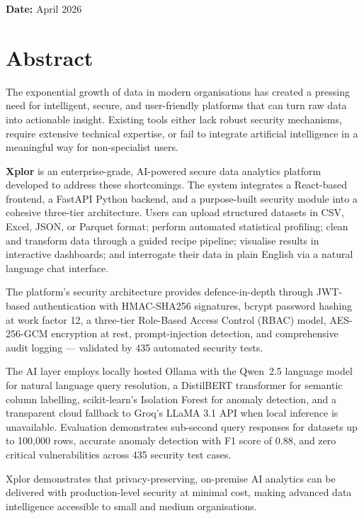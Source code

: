 \documentclass[12pt,a4paper]{report}
\begin{document}
\vspace{1.5cm}
\noindent\textbf{Date:} April 2026

\chapter*{Abstract}

The exponential growth of data in modern organisations has created a pressing need for intelligent, secure, and user-friendly platforms that can turn raw data into actionable insight. Existing tools either lack robust security mechanisms, require extensive technical expertise, or fail to integrate artificial intelligence in a meaningful way for non-specialist users.

\textbf{Xplor} is an enterprise-grade, AI-powered secure data analytics platform developed to address these shortcomings. The system integrates a React-based frontend, a FastAPI Python backend, and a purpose-built security module into a cohesive three-tier architecture. Users can upload structured datasets in CSV, Excel, JSON, or Parquet format; perform automated statistical profiling; clean and transform data through a guided recipe pipeline; visualise results in interactive dashboards; and interrogate their data in plain English via a natural language chat interface.

The platform's security architecture provides defence-in-depth through JWT-based authentication with HMAC-SHA256 signatures, bcrypt password hashing at work factor 12, a three-tier Role-Based Access Control (RBAC) model, AES-256-GCM encryption at rest, prompt-injection detection, and comprehensive audit logging — validated by 435 automated security tests.

The AI layer employs locally hosted Ollama with the Qwen~2.5 language model for natural language query resolution, a DistilBERT transformer for semantic column labelling, scikit-learn's Isolation Forest for anomaly detection, and a transparent cloud fallback to Groq's LLaMA 3.1 API when local inference is unavailable. Evaluation demonstrates sub-second query responses for datasets up to 100,000 rows, accurate anomaly detection with F1 score of 0.88, and zero critical vulnerabilities across 435 security test cases.

Xplor demonstrates that privacy-preserving, on-premise AI analytics can be delivered with production-level security at minimal cost, making advanced data intelligence accessible to small and medium organisations.
\end{document}
